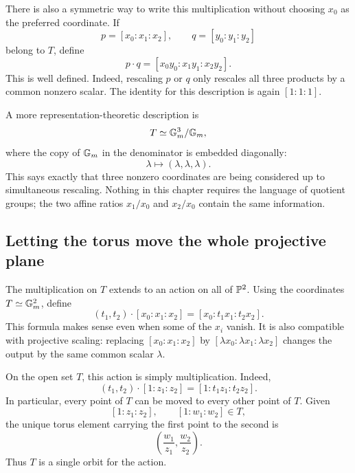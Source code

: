 There is also a symmetric way to write this multiplication without
choosing \(x_0\) as the preferred coordinate. If
\[
p=[x_0:x_1:x_2],
\qquad
q=[y_0:y_1:y_2]
\]
belong to \(T\), define
\[
p\cdot q
=
[x_0y_0:x_1y_1:x_2y_2].
\]
This is well defined. Indeed, rescaling \(p\) or \(q\) only rescales
all three products by a common nonzero scalar. The identity for this
description is again \([1:1:1]\).

\begin{observation}
A more representation-theoretic description is
\[
T\simeq\mathbb{G}_{m}^3/\mathbb{G}_{m},
\]
where the copy of \(\mathbb{G}_{m}\) in the denominator is embedded diagonally:
\[
\lambda\longmapsto(\lambda,\lambda,\lambda).
\]
This says exactly that three nonzero coordinates are being considered
up to simultaneous rescaling. Nothing in this chapter requires the
language of quotient groups; the two affine ratios
\(x_1/x_0\) and \(x_2/x_0\) contain the same information.
\end{observation}

\subsection{Letting the torus move the whole projective plane}

The multiplication on \(T\) extends to an action on all of
\(\mathbb{P}^2\). Using the coordinates \(T\simeq\mathbb{G}_{m}^2\), define
\[
(t_1,t_2)\cdot[x_0:x_1:x_2]
=
[x_0:t_1x_1:t_2x_2].
\]
This formula makes sense even when some of the \(x_i\) vanish. It is
also compatible with projective scaling: replacing
\([x_0:x_1:x_2]\) by
\([\lambda x_0:\lambda x_1:\lambda x_2]\) changes the output by the
same common scalar \(\lambda\).

On the open set \(T\), this action is simply multiplication. Indeed,
\[
(t_1,t_2)\cdot[1:z_1:z_2]
=
[1:t_1z_1:t_2z_2].
\]
In particular, every point of \(T\) can be moved to every other point
of \(T\). Given
\[
[1:z_1:z_2],
\qquad
[1:w_1:w_2]\in T,
\]
the unique torus element carrying the first point to the second is
\[
\left(\frac{w_1}{z_1},\frac{w_2}{z_2}\right).
\]
Thus \(T\) is a single orbit for the action.

